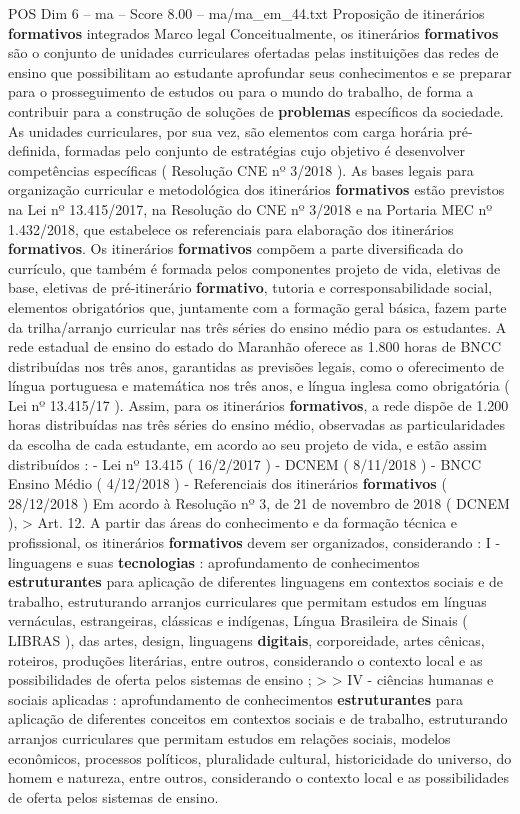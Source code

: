 \begin{textsample}{POS Dim 6 – ma – Score 8.00 – ma/ma\_em\_44.txt}  \label{ex:f6_pos_097}
Proposição de itinerários \textbf{formativos} integrados Marco legal Conceitualmente, os itinerários \textbf{formativos} são o conjunto de unidades curriculares ofertadas pelas instituições das redes de ensino que possibilitam ao estudante aprofundar seus conhecimentos e se preparar para o prosseguimento de estudos ou para o mundo do trabalho, de forma a contribuir para a construção de soluções de \textbf{problemas} específicos da sociedade.
As unidades curriculares, por sua vez, são elementos com carga horária pré-definida, formadas pelo conjunto de estratégias cujo objetivo é desenvolver competências específicas ( Resolução CNE nº 3/2018 ).
As bases legais para organização curricular e metodológica dos itinerários \textbf{formativos} estão previstos na Lei nº 13.415/2017, na Resolução do CNE nº 3/2018 e na Portaria MEC nº 1.432/2018, que estabelece os referenciais para elaboração dos itinerários \textbf{formativos}.
Os itinerários \textbf{formativos} compõem a parte diversificada do currículo, que também é formada pelos componentes projeto de vida, eletivas de base, eletivas de pré-itinerário \textbf{formativo}, tutoria e corresponsabilidade social, elementos obrigatórios que, juntamente com a formação geral básica, fazem parte da trilha/arranjo curricular nas três séries do ensino médio para os estudantes.
A rede estadual de ensino do estado do Maranhão oferece as 1.800 horas de BNCC distribuídas nos três anos, garantidas as previsões legais, como o oferecimento de língua portuguesa e matemática nos três anos, e língua inglesa como obrigatória ( Lei nº 13.415/17 ).
Assim, para os itinerários \textbf{formativos}, a rede dispõe de 1.200 horas distribuídas nas três séries do ensino médio, observadas as particularidades da escolha de cada estudante, em acordo ao seu projeto de vida, e estão assim distribuídos : - Lei nº 13.415 ( 16/2/2017 ) - DCNEM ( 8/11/2018 ) - BNCC Ensino Médio ( 4/12/2018 ) - Referenciais dos itinerários \textbf{formativos} ( 28/12/2018 ) Em acordo à Resolução nº 3, de 21 de novembro de 2018 ( DCNEM ), > Art. 12.
A partir das áreas do conhecimento e da formação técnica e profissional, os itinerários \textbf{formativos} devem ser organizados, considerando : I - linguagens e suas \textbf{tecnologias} : aprofundamento de conhecimentos \textbf{estruturantes} para aplicação de diferentes linguagens em contextos sociais e de trabalho, estruturando arranjos curriculares que permitam estudos em línguas vernáculas, estrangeiras, clássicas e indígenas, Língua Brasileira de Sinais ( LIBRAS ), das artes, design, linguagens \textbf{digitais}, corporeidade, artes cênicas, roteiros, produções literárias, entre outros, considerando o contexto local e as possibilidades de oferta pelos sistemas de ensino ; > > IV - ciências humanas e sociais aplicadas : aprofundamento de conhecimentos \textbf{estruturantes} para aplicação de diferentes conceitos em contextos sociais e de trabalho, estruturando arranjos curriculares que permitam estudos em relações sociais, modelos econômicos, processos políticos, pluralidade cultural, historicidade do universo, do homem e natureza, entre outros, considerando o contexto local e as possibilidades de oferta pelos sistemas de ensino.

\end{textsample}
